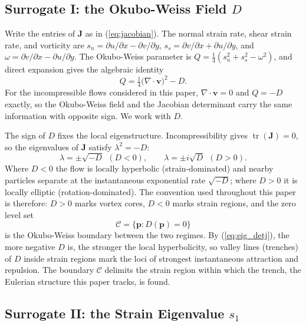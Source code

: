\documentclass[lettersize,journal]{IEEEtran}
\begin{document}
\subsection{Surrogate I: the Okubo-Weiss Field $D$}

Write the entries of $\mathbf{J}$ as in (\ref{eq:jacobian}). The normal
strain rate, shear strain rate, and vorticity are
$s_n = \partial u/\partial x - \partial v/\partial y$,
$s_s = \partial v/\partial x + \partial u/\partial y$, and
$\omega = \partial v/\partial x - \partial u/\partial y$. The Okubo-Weiss
parameter \cite{21,22} is $Q = \tfrac{1}{4}(s_n^2 + s_s^2 - \omega^2)$, and
direct expansion gives the algebraic identity
\begin{equation}
    Q = \tfrac{1}{4}\bigl(\nabla \cdot \mathbf{v}\bigr)^2 - D.
    \label{eq:okubo_weiss}
\end{equation}
For the incompressible flows considered in this paper,
$\nabla \cdot \mathbf{v} = 0$ and $Q = -D$ exactly, so the Okubo-Weiss
field and the Jacobian determinant carry the same information with
opposite sign. We work with $D$.

The sign of $D$ fixes the local eigenstructure. Incompressibility gives
$\operatorname{tr}(\mathbf{J}) = 0$, so the eigenvalues of $\mathbf{J}$
satisfy $\lambda^2 = -D$:
\begin{equation}
    \lambda = \pm\sqrt{-D} \ \ (D < 0), \qquad
    \lambda = \pm i\sqrt{D} \ \ (D > 0).
    \label{eq:eig_detj}
\end{equation}
Where $D < 0$ the flow is locally hyperbolic (strain-dominated) and
nearby particles separate at the instantaneous exponential rate
$\sqrt{-D}$; where $D > 0$ it is locally elliptic (rotation-dominated).
The convention used throughout this paper is therefore: $D > 0$ marks
vortex cores, $D < 0$ marks strain regions, and the zero level set
\begin{equation}
    \mathcal{C} = \{\mathbf{p} : D(\mathbf{p}) = 0\}
    \label{eq:ow_boundary}
\end{equation}
is the Okubo-Weiss boundary between the two regimes. By
(\ref{eq:eig_detj}), the more negative $D$ is, the stronger the local
hyperbolicity, so valley lines (trenches) of $D$ inside strain regions
mark the loci of strongest instantaneous attraction and repulsion. The
boundary $\mathcal{C}$ delimits the strain region within which the
trench, the Eulerian structure this paper tracks, is found.

\subsection{Surrogate II: the Strain Eigenvalue $s_1$}
\label{sec:strain_field}
\end{document}
